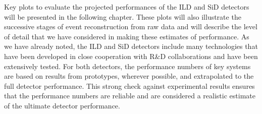 





Key plots to evaluate the projected performances of the ILD and SiD
detectors will be presented in the following chapter.    These plots
will also illustrate the successive stages of event reconstruction
from raw data and will describe the level of detail that we have
considered in making these estimates of performance.  
As we have already noted, the ILD and SiD detectors include many
technologies that have been developed in close cooperation with R\&D
collaborations 
and have been extensively tested. For both detectors, the performance numbers 
of key systems are based on results from prototypes, wherever 
possible, and extrapolated to the full detector performance. This
strong 
check against experimental results ensures that the performance 
numbers are reliable and are considered a realistic estimate of the ultimate detector performance. 
